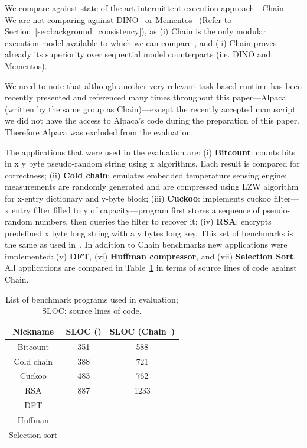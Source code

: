We compare \sys against state of the art intermittent execution approach---Chain~\cite{chain}. We are not comparing \sys against DINO~\cite{dino} or Mementos~\cite{mementos} (Refer to Section~\ref{sec:background_consistency}), as (i) Chain is the only modular execution model available to which we can compare \sys, and (ii) Chain proves already its superiority over sequential model counterparts (i.e. DINO and Mementos).

We need to note that although another very relevant task-based runtime has been recently presented and referenced many times throughout this paper---Alpaca~\cite{alpaca} (written by the same group as Chain)---except the recently accepted manuscript we did not have the access to Alpaca's code during the preparation of this paper. Therefore Alpaca was excluded from the evaluation. 

The applications that were used in the evaluation are: (i) \textbf{Bitcount}: counts bits in x y byte pseudo-random string using x algorithms. Each result is compared for correctness; (ii) \textbf{Cold chain}: emulates embedded temperature sensing engine: measurements are randomly generated and are compressed using LZW algorithm for x-entry dictionary and y-byte block; (iii) \textbf{Cuckoo}: implements cuckoo filter---x entry filter filled to y of capacity---program first stores a sequence of pseudo-random numbers, then queries the filter to recover it; (iv) \textbf{RSA}: encrypts predefined x byte long string with a y bytes long key. This set of benchmarks is the same as used in~\cite{chain,alpaca}. In addition to Chain benchmarks new applications were implemented: (v) \textbf{DFT}, (vi) \textbf{Huffman compressor}, and (vii) \textbf{Selection Sort}. All applications are compared in Table~\ref{table:benchmark_list} in terms of source lines of code against Chain. 

\begin{table}[t]
	\centering
	\footnotesize
	\begin{tabular}{|c|c|c|}
		\hline
		Nickname & SLOC (\sys) & SLOC (Chain~\cite{chain})\\
		\hline\hline
		Bitcount & 351 & 588 \\ %
		Cold chain & 388 & 721 \\ %
		Cuckoo & 483 & 762 \\ %
		RSA & 887 & 1233 \\ %
		DFT & {} & {} \\ %
		Huffman & {} & {} \\ %
		Selection sort & {} & {} \\
		\hline
	\end{tabular}
\caption{List of benchmark programs used in \sys evaluation; SLOC: source lines of code.}
\label{table:benchmark_list}
\end{table}

